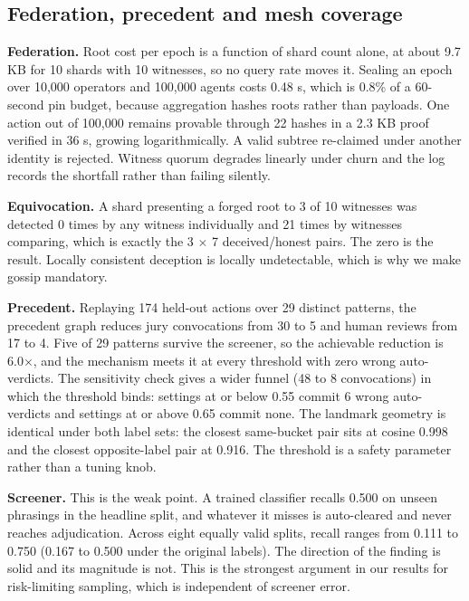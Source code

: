 \documentclass[conference]{IEEEtran}
\begin{document}
\subsection{Federation, precedent and mesh coverage}

\textbf{Federation.} Root cost per epoch is a function of shard count alone, at about 9.7 KB for 10 shards with 10 witnesses, so no query rate moves it. Sealing an epoch over 10,000 operators and 100,000 agents costs 0.48 s, which is 0.8\% of a 60-second pin budget, because aggregation hashes roots rather than payloads. One action out of 100,000 remains provable through 22 hashes in a 2.3 KB proof verified in 36 \textmu{}s, growing logarithmically. A valid subtree re-claimed under another identity is rejected. Witness quorum degrades linearly under churn and the log records the shortfall rather than failing silently.

\textbf{Equivocation.} A shard presenting a forged root to 3 of 10 witnesses was detected 0 times by any witness individually and 21 times by witnesses comparing, which is exactly the 3 $\times$ 7 deceived/honest pairs. The zero is the result. Locally consistent deception is locally undetectable, which is why we make gossip mandatory.

\textbf{Precedent.} Replaying 174 held-out actions over 29 distinct patterns, the precedent graph reduces jury convocations from 30 to 5 and human reviews from 17 to 4. Five of 29 patterns survive the screener, so the achievable reduction is 6.0$\times$, and the mechanism meets it at every threshold with zero wrong auto-verdicts. The sensitivity check gives a wider funnel (48 to 8 convocations) in which the threshold binds: settings at or below 0.55 commit 6 wrong auto-verdicts and settings at or above 0.65 commit none. The landmark geometry is identical under both label sets: the closest same-bucket pair sits at cosine 0.998 and the closest opposite-label pair at 0.916. The threshold is a safety parameter rather than a tuning knob.

\textbf{Screener.} This is the weak point. A trained classifier recalls 0.500 on unseen phrasings in the headline split, and whatever it misses is auto-cleared and never reaches adjudication. Across eight equally valid splits, recall ranges from 0.111 to 0.750 (0.167 to 0.500 under the original labels). The direction of the finding is solid and its magnitude is not. This is the strongest argument in our results for risk-limiting sampling, which is independent of screener error.
\end{document}
